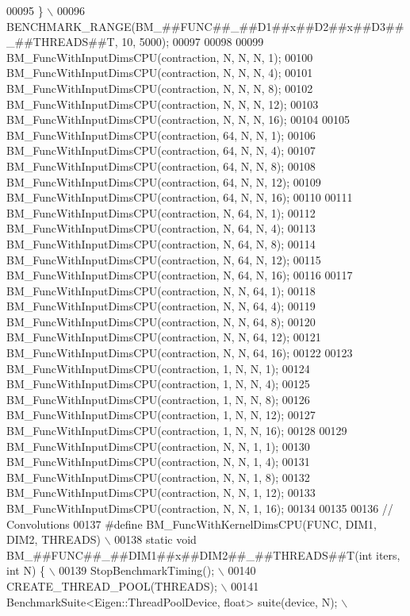 \begin{DoxyCode}
00095 \textcolor{preprocessor}{  \}                                                                             \(\backslash\)}
00096 \textcolor{preprocessor}{  BENCHMARK\_RANGE(BM\_##FUNC##\_##D1##x##D2##x##D3##\_##THREADS##T, 10, 5000);}
00097 
00098 
00099 BM\_FuncWithInputDimsCPU(contraction, N, N, N, 1);
00100 BM\_FuncWithInputDimsCPU(contraction, N, N, N, 4);
00101 BM\_FuncWithInputDimsCPU(contraction, N, N, N, 8);
00102 BM\_FuncWithInputDimsCPU(contraction, N, N, N, 12);
00103 BM\_FuncWithInputDimsCPU(contraction, N, N, N, 16);
00104 
00105 BM\_FuncWithInputDimsCPU(contraction, 64, N, N, 1);
00106 BM\_FuncWithInputDimsCPU(contraction, 64, N, N, 4);
00107 BM\_FuncWithInputDimsCPU(contraction, 64, N, N, 8);
00108 BM\_FuncWithInputDimsCPU(contraction, 64, N, N, 12);
00109 BM\_FuncWithInputDimsCPU(contraction, 64, N, N, 16);
00110 
00111 BM\_FuncWithInputDimsCPU(contraction, N, 64, N, 1);
00112 BM\_FuncWithInputDimsCPU(contraction, N, 64, N, 4);
00113 BM\_FuncWithInputDimsCPU(contraction, N, 64, N, 8);
00114 BM\_FuncWithInputDimsCPU(contraction, N, 64, N, 12);
00115 BM\_FuncWithInputDimsCPU(contraction, N, 64, N, 16);
00116 
00117 BM\_FuncWithInputDimsCPU(contraction, N, N, 64, 1);
00118 BM\_FuncWithInputDimsCPU(contraction, N, N, 64, 4);
00119 BM\_FuncWithInputDimsCPU(contraction, N, N, 64, 8);
00120 BM\_FuncWithInputDimsCPU(contraction, N, N, 64, 12);
00121 BM\_FuncWithInputDimsCPU(contraction, N, N, 64, 16);
00122 
00123 BM\_FuncWithInputDimsCPU(contraction, 1, N, N, 1);
00124 BM\_FuncWithInputDimsCPU(contraction, 1, N, N, 4);
00125 BM\_FuncWithInputDimsCPU(contraction, 1, N, N, 8);
00126 BM\_FuncWithInputDimsCPU(contraction, 1, N, N, 12);
00127 BM\_FuncWithInputDimsCPU(contraction, 1, N, N, 16);
00128 
00129 BM\_FuncWithInputDimsCPU(contraction, N, N, 1, 1);
00130 BM\_FuncWithInputDimsCPU(contraction, N, N, 1, 4);
00131 BM\_FuncWithInputDimsCPU(contraction, N, N, 1, 8);
00132 BM\_FuncWithInputDimsCPU(contraction, N, N, 1, 12);
00133 BM\_FuncWithInputDimsCPU(contraction, N, N, 1, 16);
00134 
00135 
00136 \textcolor{comment}{// Convolutions}
00137 \textcolor{preprocessor}{#define BM\_FuncWithKernelDimsCPU(FUNC, DIM1, DIM2, THREADS)                    \(\backslash\)}
00138 \textcolor{preprocessor}{  static void BM\_##FUNC##\_##DIM1##x##DIM2##\_##THREADS##T(int iters, int N) \{   \(\backslash\)}
00139 \textcolor{preprocessor}{    StopBenchmarkTiming();                                                     \(\backslash\)}
00140 \textcolor{preprocessor}{    CREATE\_THREAD\_POOL(THREADS);                                               \(\backslash\)}
00141 \textcolor{preprocessor}{    BenchmarkSuite<Eigen::ThreadPoolDevice, float> suite(device, N);           \(\backslash\)}

\end{DoxyCode}
